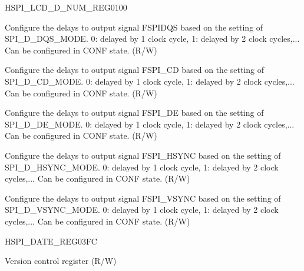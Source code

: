\begin{register}{H}{SPI\_LCD\_D\_NUM\_REG}{\hexprefix{}0100}\label{regdesc:SPILCDDNUMREG}
%
%
%
%
%
%
\regnewline%
\begin{regdesc}\begin{reglist}
\label{fielddesc:SPIDDQSNUM}\item [SPI\_D\_DQS\_NUM]
Configure the delays to output signal FSPIDQS based on the setting of SPI\_D\_DQS\_MODE. 0: delayed by 1 clock cycle, 1: delayed by 2 clock cycles,...  Can be configured in CONF state. (R/W)
\label{fielddesc:SPIDCDNUM}\item [SPI\_D\_CD\_NUM] Configure the delays to output signal FSPI\_CD based on the setting of SPI\_D\_CD\_MODE. 0: delayed by 1 clock cycle, 1: delayed by 2 clock cycles,...  Can be configured in CONF state. (R/W)
\label{fielddesc:SPIDDENUM}\item [SPI\_D\_DE\_NUM] Configure the delays to output signal FSPI\_DE based on the setting of SPI\_D\_DE\_MODE. 0: delayed by 1 clock cycle, 1: delayed by 2 clock cycles,...  Can be configured in CONF state. (R/W)
\label{fielddesc:SPIDHSYNCNUM}\item [SPI\_D\_HSYNC\_NUM] Configure the delays to output signal FSPI\_HSYNC based on the setting of SPI\_D\_HSYNC\_MODE. 0: delayed by 1 clock cycle, 1: delayed by 2 clock cycles,...  Can be configured in CONF state. (R/W)
\label{fielddesc:SPIDVSYNCNUM}\item [SPI\_D\_VSYNC\_NUM] Configure the delays to output signal FSPI\_VSYNC based on the setting of SPI\_D\_VSYNC\_MODE. 0: delayed by 1 clock cycle, 1: delayed by 2 clock cycles,...  Can be configured in CONF state. (R/W)
\end{reglist}\end{regdesc}
\end{register}


\begin{register}{H}{SPI\_DATE\_REG}{\hexprefix{}03FC}\label{regdesc:SPIDATEREG}
%
%
\regnewline%
\begin{regdesc}\begin{reglist}
\label{fielddesc:SPIDATE}\item [SPI\_DATE] Version control register (R/W)
\end{reglist}\end{regdesc}
\end{register}
